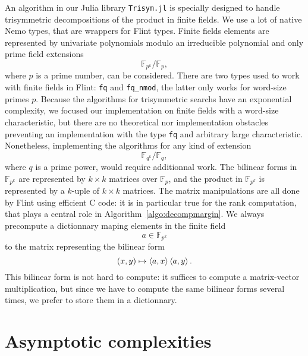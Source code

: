 An algorithm in our Julia library \texttt{Trisym.jl} is specially designed to
handle trisymmetric decompositions of the product in finite fields. We use a lot
of native Nemo types, that are wrappers for Flint types. Finite fields elements
are represented by univariate polynomials modulo an irreducible polynomial and
only prime field extensions
\[
  \mathbb{F}_{p^k}/\mathbb{F}_p,
\]
where $p$ is a prime number, can be considered.
There are two types used to work with finite fields in Flint: \texttt{fq} and
\texttt{fq\_nmod}, the latter only works for word-size primes $p$. Because the
algorithms for trisymmetric searchs have an exponential complexity, we focused
our implementation on finite fields with a word-size characteristic, but there
are no theoretical nor implementation obstacles preventing an
implementation with the type \texttt{fq} and arbitrary large characteristic.
Nonetheless, implementing the algorithms for any kind of extension
\[
  \mathbb{F}_{q^k}/\mathbb{F}_q,
\]
where $q$ is a prime power, would require additionnal work.
The
bilinear forms in $\mathbb{F}_{p^k}$ are represented by $k\times k$ matrices
over $\mathbb{F}_p$, and the product in $\mathbb{F}_{p^k}$ is represented by a
$k$-uple of $k\times k$ matrices. The matrix manipulations are all done by Flint using
efficient C code: it is in particular true for the rank computation, that plays a central role
in Algorithm~\ref{algo:decompmargin}. We always precompute a dictionnary maping
elements in the finite field
\[
  a\in\mathbb{F}_{p^k}
\]
to the matrix representing the bilinear form
\[
  (x, y)\mapsto\left\langle a,x\right\rangle\left\langle a,y\right\rangle.
\]
This bilinear form is not hard to compute: it suffices to compute a
matrix-vector multiplication, but since we have to compute the same bilinear
forms several times, we prefer to store them in a dictionnary.

%

\section{Asymptotic complexities}
\label{sec:asymptotic}

